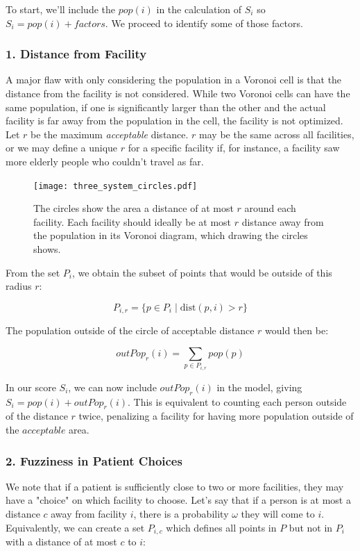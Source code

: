 \documentclass{article}
\begin{document}
To start, we'll include the $pop(i)$ in the calculation of $S_i$ so $S_i = pop(i) + factors$. We proceed to identify some of those factors.

\subsubsection*{1. Distance from Facility}
A major flaw with only considering the population in a Voronoi cell is that the distance from the facility is not considered. While two Voronoi cells can have the same population, if one is significantly larger than the other and the actual facility is far away from the population in the cell, the facility is not optimized. 
Let $r$ be the maximum \textit{acceptable} distance. $r$ may be the same across all facilities, or we may define a unique $r$ for a specific facility if, for instance, a facility saw more elderly people who couldn't travel as far. 

\begin{figure}[h!]
    \centering
    \captionsetup{justification=centering,width=.9\linewidth}
    \captionsetup{justification=centering}
    \texttt{[image: three\_system\_circles.pdf]}
    \caption{The circles show the area a distance of at most $r$ around each facility. Each facility should ideally be at most $r$ distance away from the population in its Voronoi diagram, which drawing the circles shows.}
    \label{fig:final-interface}
\end{figure}

From the set $P_i$, we obtain the subset of points that would be outside of this radius $r$:

$$
P_{i,r} = \{p \in P_i \mid \mathrm{dist}(p,i) >r\}
$$

The population outside of the circle of acceptable distance $r$ would then be:

$$
outPop_r(i) = \sum_{p \in P_{i, r}} pop(p)
$$

In our score $S_i$, we can now include $outPop_r(i)$ in the model, giving $S_i = pop(i) + outPop_r(i)$. This is equivalent to counting each person outside of the distance $r$ twice, penalizing a facility for having more population outside of the $acceptable$ area.

\subsubsection*{2. Fuzziness in Patient Choices}
We note that if a patient is sufficiently close to two or more facilities, they may have a "choice" on which facility to choose. Let's say that if a person is at most a distance $c$ away from facility $i$, there is a probability $\omega$ they will come to $i$. Equivalently, we can create a set $P_{i, c}$ which defines all points in $P$ but not in $P_i$ with a distance of at most $c$ to $i$: 
\end{document}
